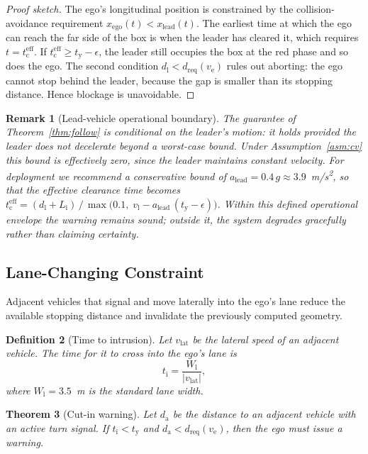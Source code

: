 \documentclass[conference, a4paper]{IEEEtran}
\theoremstyle{plain}
\newtheorem{theorem}{Theorem}
\newtheorem{definition}[theorem]{Definition}
\newtheorem{remark}[theorem]{Remark}
\newcommand{\dreq}{d_{\mathrm{req}}}
\newcommand{\da}{d_{\mathrm{a}}}
\newcommand{\dl}{d_{\mathrm{l}}}
\newcommand{\tred}{t_{\mathrm{y}}}
\newcommand{\teff}{t_{\mathrm{c}}^{\mathrm{eff}}}
\newcommand{\tint}{t_{\mathrm{i}}}
\newcommand{\Li}{L_{\mathrm{i}}}
\newcommand{\Wl}{W_{\mathrm{l}}}
\newcommand{\ve}{v_{\mathrm{e}}}
\newcommand{\vl}{v_{\mathrm{l}}}
\newcommand{\vlat}{v_{\mathrm{lat}}}
\begin{document}
\begin{proof}[Proof sketch]
The ego's longitudinal position is constrained by the collision-avoidance
requirement $x_{\mathrm{ego}}(t) < x_{\mathrm{lead}}(t)$. The earliest time
at which the ego can reach the far side of the box is when the leader has
cleared it, which requires $t = \teff$. If $\teff \geq \tred - \epsilon$, the
leader still occupies the box at the red phase and so does the ego. The
second condition $\dl < \dreq(\ve)$ rules out aborting: the ego cannot stop
behind the leader, because the gap is smaller than its stopping distance.
Hence blockage is unavoidable.
\end{proof}

\begin{remark}[Lead-vehicle operational boundary]
\label{rem:leadbound}
The guarantee of Theorem~\ref{thm:follow} is conditional on the leader's
motion: it holds provided the leader does not decelerate beyond a worst-case
bound. Under Assumption~\ref{asm:cv} this bound is effectively zero, since the
leader maintains constant velocity. For deployment we recommend a conservative
bound of $a_{\mathrm{lead}} = 0.4\,g \approx 3.9$~\si{m/s^2}, so that the
effective clearance time becomes
$\teff = (\dl + \Li)\,/\,\max\bigl(0.1,\; \vl - a_{\mathrm{lead}}\,(\tred - \epsilon)\bigr)$.
Within this defined operational envelope the warning remains sound; outside it,
the system degrades gracefully rather than claiming certainty.
\end{remark}

\subsection{Lane-Changing Constraint}
\label{subsec:cutin}

Adjacent vehicles that signal and move laterally into the ego's lane reduce
the available stopping distance and invalidate the previously computed
geometry.

\begin{definition}[Time to intrusion]
\label{def:intrusion}
Let $\vlat$ be the lateral speed of an adjacent vehicle. The time for it to
cross into the ego's lane is
\begin{equation}
\tint = \frac{\Wl}{|\vlat|},
\label{eq:intrude}
\end{equation}
where $\Wl = 3.5$~m is the standard lane width.
\end{definition}

\begin{theorem}[Cut-in warning]
\label{thm:cutin}
Let $\da$ be the distance to an adjacent vehicle with an active turn signal.
If $\tint < \tred$ and $\da < \dreq(\ve)$, then the ego must issue a warning.
\end{theorem}
\end{document}
